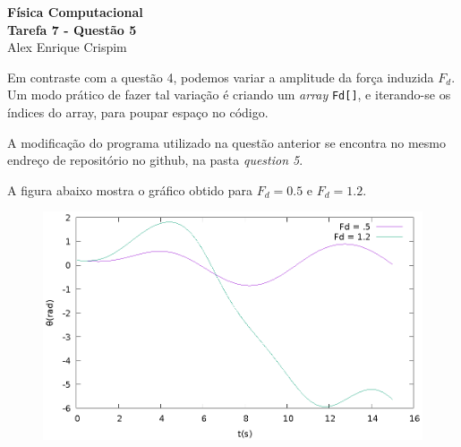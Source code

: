 


  \begin{center}
    \LARGE \textbf{Física Computacional} \\
    \Large \textbf{Tarefa 7 - Questão 5} \\
    \large Alex Enrique Crispim
  \end{center}

  Em contraste com a questão 4, podemos variar a amplitude da força induzida $F_d$. Um modo prático de fazer tal variação é criando um \textit{array} \texttt{Fd[]}, e iterando-se os índices do array, para poupar espaço no código.

  A modificação do programa utilizado na questão anterior se encontra no mesmo endreço de repositório no github, na pasta \textit{question 5}.

  A figura abaixo mostra o gráfico obtido para $F_d = 0.5$ e $F_d = 1.2$.

  \begin{figure}[h]
    \center
    \includegraphics{q5Fig}
  \end{figure}



